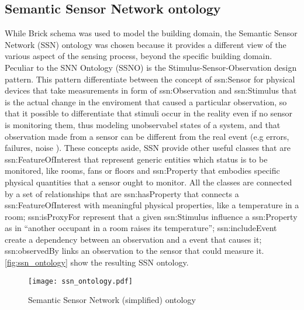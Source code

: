 \subsection{Semantic Sensor Network ontology} \label{subsec:ssn}
While Brick schema was used to model the building domain, the Semantic Sensor Network (SSN) ontology \cite{ssn_ontology} was chosen because it provides a different view of the various aspect of the sensing process, beyond the specific building domain. Peculiar to the SNN Ontology (SSNO) is the Stimulus-Sensor-Observation design pattern.
This pattern differentiate between the concept of ssn:Sensor for physical devices that take measurements in form of ssn:Observation and ssn:Stimulus that is the actual change in the enviroment that caused a particular observation, so that it possible to differentiate that stimuli occur in the reality even if no sensor is monitoring them, thus modeling unobservabel states of a system, and that observation made from a sensor can be different from the real event (e.g errors, failures, noise ). These concepts aside, SSN provide other useful classes that are ssn:FeatureOfInterest that represent generic entities which status is to be monitored, like rooms, fans or floors and ssn:Property that embodies specific physical quantities that a sensor ought to monitor. All the classes are connected by a set of relationships that are ssn:hasProperty that connects a ssn:FeatureOfInterest with meaningful physical properties, like a temperature in a room; ssn:isProxyFor represent that a given ssn:Stimulus influence a ssn:Property as in ``another occupant in a room raises its temperature''; ssn:includeEvent create a dependency between an observation and a event that causes it; ssn:observedBy links an observation to the sensor that could measure it. \autoref{fig:ssn_ontology} show the resulting SSN ontology.

\begin{figure}
  \centering
  \texttt{[image: ssn\_ontology.pdf]}
  \caption{Semantic Sensor Network (simplified) ontology}
  \label{fig:ssn_ontology}
\end{figure}

